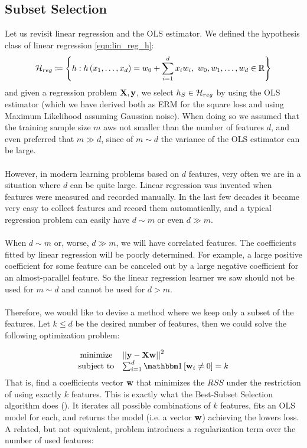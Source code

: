 
\subsection{Subset Selection}
Let us revisit linear regression and the OLS estimator. We defined the hypothesis class of linear regression \ref{eqn:lin_reg_h}: $$ \mathcal{H}_{reg}\coloneqq\left\{h: h\left(x_1,\ldots,x_d\right)=w_0+\sum^d_{i=1}x_iw_i,\,\, w_0,w_1,\ldots,w_d\in\mathbb{R}\right\} $$ and given a regression problem $\mathbf{X}, \mathbf{y}$, we select $h_S\in\mathcal{H}_{reg}$ by using the OLS estimator (which we have derived both as ERM for the square loss and using Maximum Likelihood assuming Gaussian noise). When doing so we assumed that the training sample size $m$ aws not smaller than the number of features $d$, and even preferred that $m\gg d$, since of $m\sim d$ the variance of the OLS estimator can be large.
\\~\\
However, in modern learning problems based on $d$ features, very often we are in a situation where $d$ can be quite large. Linear regression was invented when features were measured and recorded manually. In the last few decades it became very easy to collect features and record them automatically, and a typical regression problem can easily have $d\sim m$ or even $d\gg m$. 
\\~\\
When $d\sim m$ or, worse, $d\gg m$, we will have correlated features. The coefficients fitted by linear regression will be poorly determined. For example, a large positive coefficient for some feature can be canceled out by a large negative coefficient for an almost-parallel feature. So the linear regression learner we saw should not be used for $m\sim d$ and cannot be used for $d>m$.
\\~\\
Therefore, we would like to devise a method where we keep only a subset of the features. Let $k\leq d$ be the desired number of features, then we could solve the following optimization problem:

\begin{equation}
\begin{array}{cl}
\text{minimize}   &  \norm{\y-\X\w}^2 \\
\text{subject to} &  \sum_{i=1}^d \indc{\w_i \neq 0} = k
\end{array}
\label{eqn:best_subset}
\end{equation}
That is, find a coefficients vector $\mathbf{w}$ that minimizes the $RSS$ under the restriction of using exactly $k$ features. This is exactly what the Best-Subset Selection algorithm does (). It iterates all possible combinations of $k$ features, fits an OLS model for each, and returns the model (i.e. a vector $\mathbf{w}$) achieving the lowers loss. A related, but not equivalent, problem introduces a regularization term over the number of used features:

